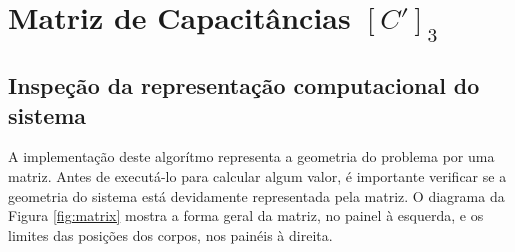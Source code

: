 \documentclass{aleph-revista}
\begin{document}
\membrete

\vspace{1em}


\section{Matriz de Capacitâncias $[C']_3$}

\subsection{Inspeção da representação computacional do sistema}
A implementação deste algorítmo representa a geometria do problema por uma matriz. Antes de executá-lo para calcular algum valor, é importante verificar se a geometria do sistema está devidamente representada pela matriz. O diagrama da Figura \ref{fig:matrix} mostra a forma geral da matriz, no painel à esquerda, e os limites das posições dos corpos, nos painéis à direita.


\newpage
\end{document}
